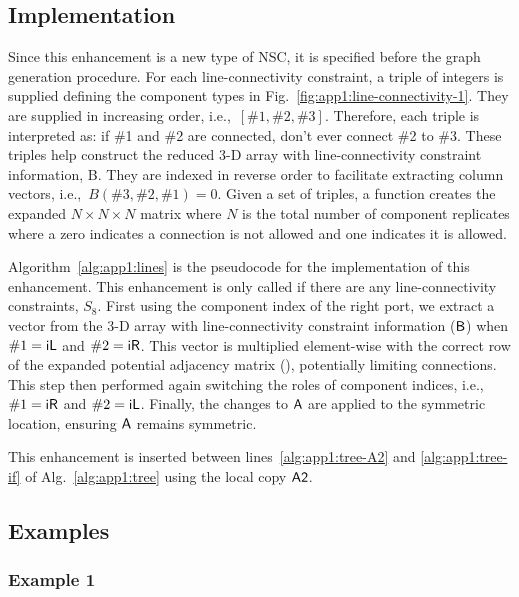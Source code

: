 \subsection{Implementation}

Since this enhancement is a new type of NSC, it is specified before the graph generation procedure. For each line-connectivity constraint, a triple of integers is supplied defining the component types in Fig.~\ref{fig:app1:line-connectivity-1}. They are supplied in increasing order, i.e.,~$[\#1, \#2, \#3]$. Therefore, each triple is interpreted as: 
if \#1 and \#2 are connected, don't ever connect \#2 to \#3.
These triples help construct the reduced 3-D array with line-connectivity constraint information, \gls{B}. They are indexed in reverse order to facilitate extracting column vectors, i.e.,~$B(\#3,\#2,\#1) = 0$.
Given a set of triples, a function creates the expanded $N \times N \times N$ matrix where $N$ is the total number of component replicates where a zero indicates a connection is not allowed and one indicates it is allowed.



Algorithm~\ref{alg:app1:lines} is the pseudocode for the implementation of this enhancement.
This enhancement is only called if there are any line-connectivity constraints, $S_8$.
First using the component index of the right port, we extract a vector from the 3-D array with line-connectivity constraint information ($\textup{\textsf{B}}$) when $\#1 = \textup{\textsf{iL}}$ and $\#2 = \textup{\textsf{iR}}$.
This vector is multiplied element-wise with the correct row of the expanded potential adjacency matrix (), potentially limiting connections.
This step then performed again switching the roles of component indices, i.e.,~$\#1 = \textup{\textsf{iR}}$ and $\#2 = \textup{\textsf{iL}}$.
Finally, the changes to $\textup{\textsf{A}}$ are applied to the symmetric location, ensuring $\textup{\textsf{A}}$ remains symmetric.

This enhancement is inserted between lines~\ref{alg:app1:tree-A2} and \ref{alg:app1:tree-if} of Alg.~\ref{alg:app1:tree} using the local copy $\textup{\textsf{A2}}$.

\subsection{Examples}

\subsubsection{Example 1\label{sec:app1:lines-ex1}}

